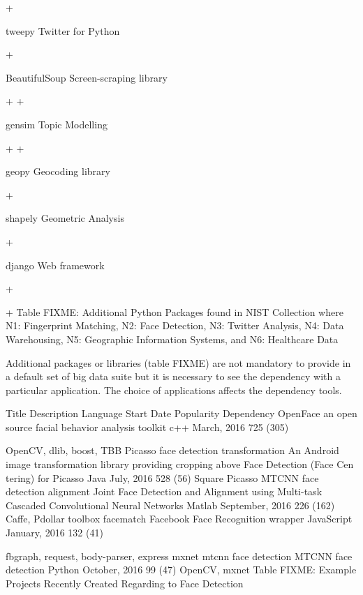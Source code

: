 \documentclass[9pt,twocolumn,twoside]{styles/osajnl}
\begin{document}
	 
	+
	 
	 
	 
	tweepy
	Twitter for Python
	 
	 
	+
	 
	 
	 
	BeautifulSoup
	Screen-scraping library
	 
	 
	+
	+
	 
	 
	gensim
	Topic Modelling
	 
	 
	+
	+
	 
	 
	geopy
	Geocoding library
	 
	 
	 
	 
	+
	 
	shapely
	Geometric Analysis
	 
	 
	 
	 
	+
	 
	django
	Web framework
	 
	 
	 
	+
	 
	+
	Table FIXME: Additional Python Packages found in NIST
        Collection where N1: Fingerprint Matching, N2: Face Detection,
        N3: Twitter Analysis, N4: Data Warehousing, N5: Geographic
        Information Systems, and N6: Healthcare Data



Additional packages or libraries (table FIXME) are not mandatory to provide in a default set of big data suite but it is necessary to see the dependency with a particular application. The choice of applications affects the dependency tools.


Title
	Description
	Language
	Start Date
	Popularity
	Dependency
	OpenFace
	an  open  source  facial   behavior analysis toolkit
	c++
	March, 2016
	725 (305)

	OpenCV,                dlib,
boost, TBB
	Picasso  face
detection transformation
	An  Android  image   transformation library providing cropping above Face Detection (Face Cen tering) for Picasso
	Java
	July, 2016
	528 (56)
	Square Picasso
	MTCNN
face               detection alignment
	Joint Face Detection and Alignment using Multi-task Cascaded Convolutional Neural Networks
	Matlab
	September, 2016
	226 (162)
	Caffe,  Pdollar toolbox
	facematch
	Facebook Face           Recognition
wrapper
	JavaScript
	January, 2016
	132 (41)

	fbgraph,           request,
body-parser,             express
	mxnet mtcnn face detection
	MTCNN face detection
	Python
	October, 2016
	99 (47)
	OpenCV, mxnet
	Table FIXME: Example Projects Recently Created Regarding to Face Detection
\end{document}
